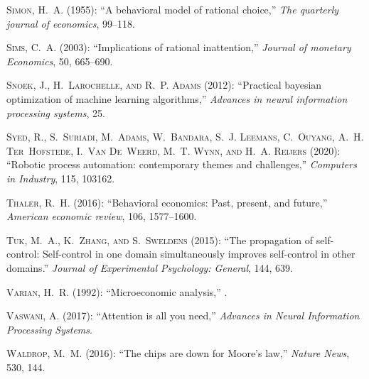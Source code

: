 \begin{thebibliography}{1}
\textsc{Simon, H.~A.} (1955): \enquote{A behavioral model of rational choice,} \emph{The quarterly journal of economics}, 99--118.

\textsc{Sims, C.~A.} (2003): \enquote{Implications of rational inattention,} \emph{Journal of monetary Economics}, 50, 665--690.

\textsc{Snoek, J., H.~Larochelle, and R.~P. Adams} (2012): \enquote{Practical bayesian optimization of machine learning algorithms,} \emph{Advances in neural information processing systems}, 25.

\textsc{Syed, R., S.~Suriadi, M.~Adams, W.~Bandara, S.~J. Leemans, C.~Ouyang, A.~H. Ter~Hofstede, I.~Van De~Weerd, M.~T. Wynn, and H.~A. Reijers} (2020): \enquote{Robotic process automation: contemporary themes and challenges,} \emph{Computers in Industry}, 115, 103162.

\textsc{Thaler, R.~H.} (2016): \enquote{Behavioral economics: Past, present, and future,} \emph{American economic review}, 106, 1577--1600.

\textsc{Tuk, M.~A., K.~Zhang, and S.~Sweldens} (2015): \enquote{The propagation of self-control: Self-control in one domain simultaneously improves self-control in other domains.} \emph{Journal of Experimental Psychology: General}, 144, 639.

\textsc{Varian, H.~R.} (1992): \enquote{Microeconomic analysis,} .

\textsc{Vaswani, A.} (2017): \enquote{Attention is all you need,} \emph{Advances in Neural Information Processing Systems}.

\textsc{Waldrop, M.~M.} (2016): \enquote{The chips are down for Moore’s law,} \emph{Nature News}, 530, 144.


\end{thebibliography}
